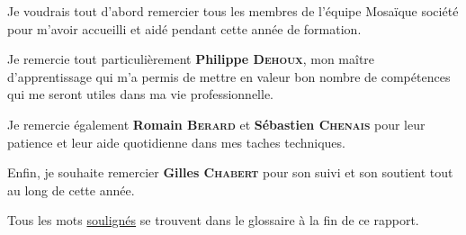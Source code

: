 Je voudrais tout d'abord remercier tous les membres de l'équipe Mosaïque société pour m'avoir accueilli et aidé pendant cette année de formation.

Je remercie tout particulièrement \textbf {Philippe \textsc{Dehoux}}, mon maître d'apprentissage qui m'a permis de mettre en valeur bon nombre de compétences qui me seront utiles dans ma vie professionnelle.

Je remercie également \textbf {Romain \textsc{Berard}} et \textbf {Sébastien \textsc{Chenais}} pour leur patience et leur aide quotidienne dans mes taches techniques.

Enfin, je souhaite remercier \textbf {Gilles \textsc{Chabert}} pour son suivi et son soutient tout au long de cette année.

\vfill

\begin{center}
    Tous les mots \underline{soulignés} se trouvent dans le glossaire à la fin de ce rapport.
\end{center}